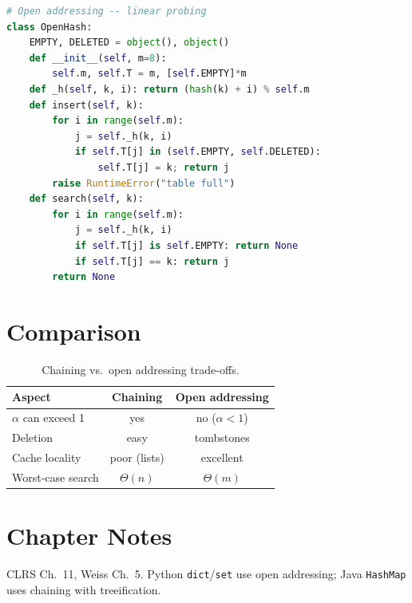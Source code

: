 \begin{lstlisting}[language=Python]
# Open addressing -- linear probing
class OpenHash:
    EMPTY, DELETED = object(), object()
    def __init__(self, m=8):
        self.m, self.T = m, [self.EMPTY]*m
    def _h(self, k, i): return (hash(k) + i) % self.m
    def insert(self, k):
        for i in range(self.m):
            j = self._h(k, i)
            if self.T[j] in (self.EMPTY, self.DELETED):
                self.T[j] = k; return j
        raise RuntimeError("table full")
    def search(self, k):
        for i in range(self.m):
            j = self._h(k, i)
            if self.T[j] is self.EMPTY: return None
            if self.T[j] == k: return j
        return None
\end{lstlisting}

\section{Comparison}

\begin{table}[h]
\centering
\small
\begin{tabular}{lcc}
\toprule
Aspect & Chaining & Open addressing \\
\midrule
$\alpha$ can exceed 1 & yes & no ($\alpha<1$) \\
Deletion & easy & tombstones \\
Cache locality & poor (lists) & excellent \\
Worst-case search & $\Theta(n)$ & $\Theta(m)$ \\
\bottomrule
\end{tabular}
\caption{Chaining vs.\ open addressing trade-offs.}
\label{tab:hash-compare}
\end{table}

\section{Chapter Notes}
CLRS Ch.~11, Weiss Ch.~5. Python \texttt{dict}/\texttt{set} use open addressing; Java \texttt{HashMap} uses chaining with treeification.

